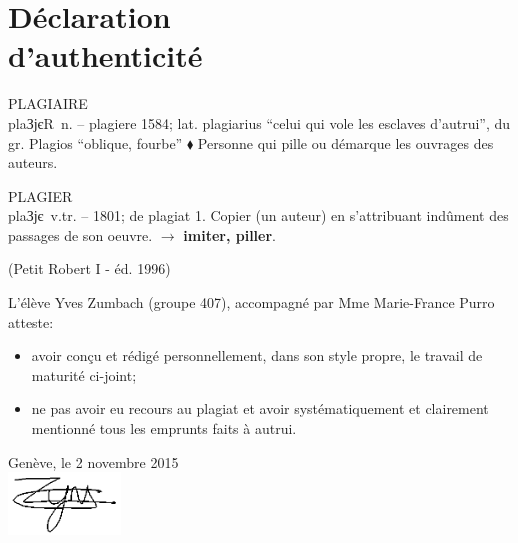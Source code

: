 \chapter*{Déclaration\\\null\hspace*{4.3cm}d'authenticité}
\hspace*{4.5cm}
\begin{minipage}{\textwidth-4.5cm}
	\setlength{\parskip}{\currentparskip}
	\begin{mdframed}[
			linecolor=Grey,
			backgroundcolor=White,
			skipabove=0mm,
			skipbelow=0mm,
			innertopmargin=2mm,
			innerbottommargin=2mm,
			innerleftmargin=2mm,
			innerrightmargin=0mm,
			leftmargin=0mm,
			rightline=false,
			topline=false,
			bottomline=false,
			linewidth=1mm
		]
		PLAGIAIRE\\
		\lbrack plaЗјєR\rbrack\ n. -- plagiere 1584; lat. plagiarius \enquote{celui qui vole les esclaves d’autrui}, du gr. Plagios
		\enquote{oblique, fourbe} $\blacklozenge$ Personne qui pille ou démarque les ouvrages des auteurs.
		
		PLAGIER\\
		\lbrack plaЗјє\rbrack\ v.tr. -- 1801; de plagiat 1. Copier (un auteur) en s’attribuant indûment des passages de son
		oeuvre. $\rightarrow$ \textbf{imiter, piller}.
		
		\hfill (Petit Robert I - éd. 1996)
	\end{mdframed}
	
	\vspace*{3mm}
	L'élève Yves Zumbach (groupe 407), accompagné par Mme Marie-France Purro atteste:
	\begin{itemize}
		\item avoir conçu et rédigé personnellement, dans son style propre, le travail de maturité ci-joint;
		\item ne pas avoir eu recours au plagiat et avoir systématiquement et clairement mentionné tous les emprunts faits à autrui.
	\end{itemize}
	
	\vspace*{1cm}
	\null\hfill Genève, le 2 novembre 2015\\
	\null\hfill \includegraphics[width=3cm]{./images/maSignature.png}
\end{minipage}



